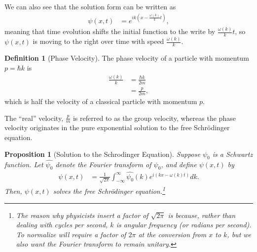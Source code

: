 \documentclass[10pt]{extarticle}
\theoremstyle{plain}
\newtheorem*{proposition}{Proposition}%
\theoremstyle{definition}
\newtheorem*{definition}{Definition}
\theoremstyle{remark}
\begin{document}
  We can also see that the solution form can be written as
  \begin{align*}
    \psi(x,t) &= e^{ik\left(x - \frac{\omega(k)}{k}t\right)},
  \end{align*}
  meaning that time evolution shifts the initial function to the write by $\frac{\omega(k)}{k}t$, so $\psi(x,t)$ is moving to the right over time with speed $\frac{\omega(k)}{k}$.
  \begin{definition}[Phase Velocity]
    The phase velocity of a particle with momentum $p = \hbar k$ is
    \begin{align*}
      \frac{\omega(k)}{k} &= \frac{\hbar k}{2m}\\
                          &= \frac{p}{2m},
    \end{align*}
    which is half the velocity of a classical particle with momentum $p$.
  \end{definition}
  The ``real'' velocity, $\frac{p}{m}$ is referred to as the group velocity, whereas the phase velocity originates in the pure exponential solution to the free Schrödinger equation.
  \begin{proposition}[Solution to the Schrodinger Equation]
    Suppose $\psi_0$ is a Schwartz function. Let $\hat{\psi_0}$ denote the Fourier transform of $\psi_0$, and define $\psi(x,t)$ by
    \begin{align*}
      \psi(x,t) &= \frac{1}{\sqrt{2\pi}}\int_{-\infty}^{\infty}\hat{\psi_0}(k)e^{i\left(kx - \omega(k)t\right)}dk.
    \end{align*}
    Then, $\psi(x,t)$ solves the free Schrödinger equation.\footnote{The reason why physicists insert a factor of $\sqrt{2\pi}$ is because, rather than dealing with cycles per second, $k$ is angular frequency (or radians per second). To normalize will require a factor of $2\pi$ at the conversion from $x$ to $k$, but we also want the Fourier transform to remain unitary.}
  \end{proposition}
\end{document}
